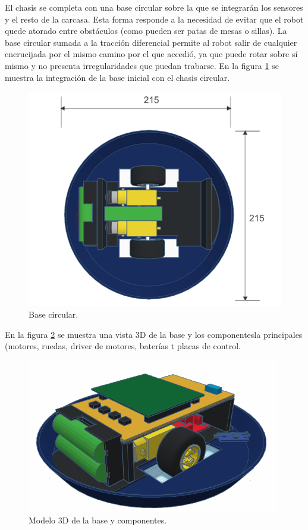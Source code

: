 El chasis se completa con una base circular sobre la que se integrarán los sensores y el resto de la carcasa. Esta forma responde a la necesidad de evitar que el robot quede atorado entre obstáculos (como pueden ser patas de mesas o sillas). La base circular sumada a la tracción diferencial permite al robot salir de cualquier encrucijada por el mismo camino por el que accedió, ya que puede rotar sobre sí mismo y no presenta irregularidades que puedan trabarse. En la figura \ref{fig:base2} se muestra la integración de la base inicial con el chasis circular. 

\begin{figure}[h]
	\centering
	\includegraphics[width=12cm]{./Figures/base2.png}
	\caption{Base circular.}
	\label{fig:base2}
\end{figure}

En la figura \ref{fig:basearmada} se muestra una vista 3D  de la base y los componentesla principales (motores, ruedas, driver de motores, baterías t placas de control. 


\begin{figure}[h]
	\centering
	\includegraphics[width=11cm]{./Figures/basearmada.png}
	\caption{Modelo 3D de la base y componentes.}
	\label{fig:basearmada}
\end{figure}


